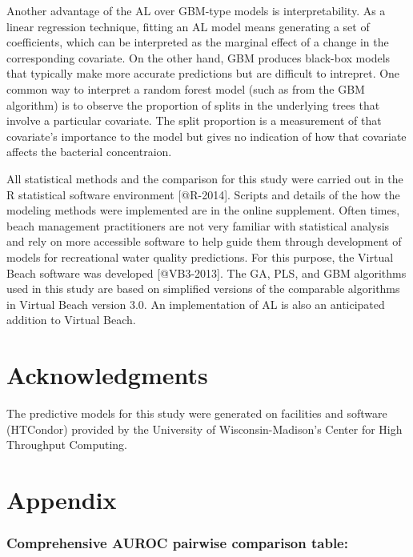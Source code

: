 Another advantage of the AL over GBM-type models is interpretability. As
a linear regression technique, fitting an AL model means generating a
set of coefficients, which can be interpreted as the marginal effect of
a change in the corresponding covariate. On the other hand, GBM produces
black-box models that typically make more accurate predictions but are
difficult to intrepret. One common way to interpret a random forest
model (such as from the GBM algorithm) is to observe the proportion of
splits in the underlying trees that involve a particular covariate. The
split proportion is a measurement of that covariate's importance to the
model but gives no indication of how that covariate affects the
bacterial concentraion.

All statistical methods and the comparison for this study were carried
out in the R statistical software environment {[}@R-2014{]}. Scripts and
details of the how the modeling methods were implemented are in the
online supplement. Often times, beach management practitioners are not
very familiar with statistical analysis and rely on more accessible
software to help guide them through development of models for
recreational water quality predictions. For this purpose, the Virtual
Beach software was developed {[}@VB3-2013{]}. The GA, PLS, and GBM
algorithms used in this study are based on simplified versions of the
comparable algorithms in Virtual Beach version 3.0. An implementation of
AL is also an anticipated addition to Virtual Beach.

\section{Acknowledgments}\label{acknowledgments}

The predictive models for this study were generated on facilities and
software (HTCondor) provided by the University of Wisconsin-Madison's
Center for High Throughput Computing.

\section{Appendix}\label{appendix}

\subsubsection{Comprehensive AUROC pairwise comparison
table:}\label{comprehensive-auroc-pairwise-comparison-table}


